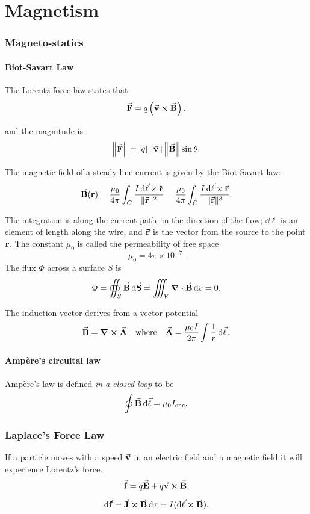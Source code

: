 \part{Magnetism}
\section{Magneto-statics}
\subsection{Biot-Savart Law}

The Lorentz force law states that
\[
	\va{F} = q\left( \va{v}\cross\va{B} \right)
	.\]

and the magnitude is
\[
	\left\|\va{F}\right\| = |q|\left\|\va{v}\right\| \left\|\va{B}\right\|\sin\theta
	.\]

The magnetic field of a steady line current is given by the Biot-Savart law:
\[
	\va{B}(\vb{r}) =  \frac{\mu_0}{4\pi}\int_{C}\frac{I \dd{\va{\ell}}\times \vu{r} }{ \| \va{r} \| ^2} = \frac{\mu_0}{4\pi}\int_{C}\frac{I \dd{\va{\ell}}\times \va{r} }{ \| \va{r} \| ^3}
	.\]

The integration is along the current path, in the direction of the flow; $\dd{\ell} $ is an element of length along the wire, and $\va{r}$ is the vector from the source to the point $\vb{r}$. The constant $\mu_0$ is called the permeability of free space
\[
	\mu_0=4\pi\times 10^{-7}
	.\]
The flux $\Phi$ across a surface $S$ is
\[
	\Phi=\oiint_S \va{B}\dd{\va{S}} = \iiint_V \div{\va{B}}\dd{v} =0
	.\]


The induction vector derives from a vector potential
\[
	\va{B}=\curl{\va{A}}\qq{where}\va{A}=\frac{\mu_0I}{2\pi}\int \frac{1}{r}\dd{\va{\ell}}
	.\]
\subsection{Ampère's circuital law}
Ampère's law is defined \emph{in a closed loop} to be
\[
	\oint \va{B} \dd{\va{\ell}} = \mu_0 I_\text{enc}
	.\]

\section{Laplace’s Force Law}
If a particle moves with a speed $\va{v}$ in an electric field and a magnetic field it will experience Lorentz's force.
\[
	\va{f} = q\va{E}+q\va{v}\cross\va{B}
	.\]

\[
	\dd{\va{f}} = \va{J}\cross\va{B}\dd{\tau} = I(\dd{\va{\ell}}\cross\va{B})
	.\]

